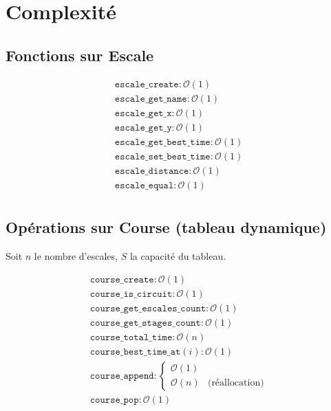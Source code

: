 \section{Complexité}\label{complexite}

\subsection{Fonctions sur Escale}

\begin{align*}
\texttt{escale\_create} : \mathcal{O}(1) \\
\texttt{escale\_get\_name} : \mathcal{O}(1)\\
\texttt{escale\_get\_x} : \mathcal{O}(1)\\
\texttt{escale\_get\_y} : \mathcal{O}(1)\\
\texttt{escale\_get\_best\_time} : \mathcal{O}(1)\\
\texttt{escale\_set\_best\_time} : \mathcal{O}(1)\\
\texttt{escale\_distance} : \mathcal{O}(1)\\
\texttt{escale\_equal} : \mathcal{O}(1)\\
\end{align*}

\subsection{Opérations sur Course (tableau dynamique)}
Soit $n$ le nombre d'escales, $S$ la capacité du tableau.

\begin{align*}
\texttt{course\_create} : \mathcal{O}(1)\\
\texttt{course\_is\_circuit} : \mathcal{O}(1)\\
\texttt{course\_get\_escales\_count} : \mathcal{O}(1) \\
\texttt{course\_get\_stages\_count} : \mathcal{O}(1) \\
\texttt{course\_total\_time} : \mathcal{O}(n) \\
\texttt{course\_best\_time\_at}(i) : \mathcal{O}(1) \\
\texttt{course\_append} :
    \begin{cases}
        \mathcal{O}(1) & \\
        \mathcal{O}(n) & \text{(réallocation)}
    \end{cases} \\
\texttt{course\_pop} : \mathcal{O}(1)
\end{align*}


